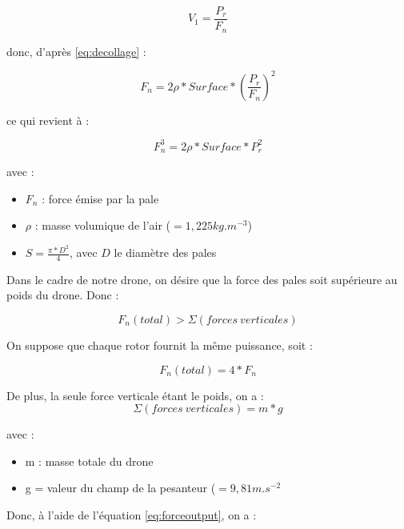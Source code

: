 \documentclass[a4paper,10pt]{report}
\begin{document}
	\begin{equation}
	  V_{1} =  \frac{P_{r}}{F_{n}}
	\end{equation}
	
	donc, d'après \ref{eq:decollage} :
	
	\begin{equation}
	  F_{n} = 2 \rho * Surface * (\frac{P_{r}}{F_{n}})^{2}
	\end{equation}
	
	ce qui revient à :
	
	\begin{equation}
	  \label{eq:forceoutput}
	  F_{n}^{3} = 2 \rho * Surface * P_{r}^{2}
	\end{equation}
	
	avec :
	
	\begin{itemize}
	  \item $F_{n}$ : force émise par la pale
	  \item $\rho$ : masse volumique de l'air ($= 1,225kg.m^{-3}$)
	  \item $S = \frac{\pi * {D}^{2}}{4}$, avec $D$ le diamètre des pales
	\end{itemize}
	
	Dans le cadre de notre drone, on désire que la force des pales soit 
supérieure au poids du drone. Donc :
		
	\begin{equation}
	  F_{n}(total) > \Sigma (forces \ verticales) 
	\end{equation}
	
	On suppose que chaque rotor fournit la même puissance, soit :
	
	\begin{equation}
	  F_{n}(total) = 4 * F_{n} 
	\end{equation}

	De plus, la seule force verticale étant le poids, on a : 
	\begin{equation}
	  \Sigma (forces \ verticales) = m * g
	\end{equation}
	
	avec :
	
	\begin{itemize}
	  \item  m : masse totale du drone
	  \item  g = valeur du champ de la pesanteur ($=9,81m.s^{-2}$
	\end{itemize}

	Donc, à l'aide de l'équation \ref{eq:forceoutput}, on a : 
	
\end{document}
